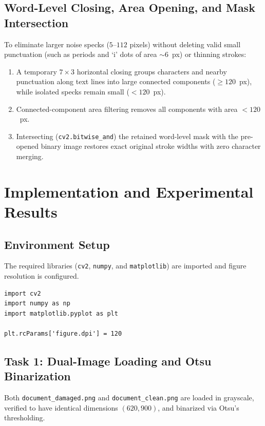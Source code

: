 \documentclass[12pt]{article}
\begin{document}
\subsection{Word-Level Closing, Area Opening, and Mask Intersection}
To eliminate larger noise specks ($5$--$112$ pixels) without deleting valid small punctuation (such as periods and `i' dots of area $\sim 6$~px) or thinning strokes:
\begin{enumerate}
    \item A temporary $7 \times 3$ horizontal closing groups characters and nearby punctuation along text lines into large connected components ($\ge 120$~px), while isolated specks remain small ($< 120$~px).
    \item Connected-component area filtering removes all components with area $< 120$~px.
    \item Intersecting (\texttt{cv2.bitwise\_and}) the retained word-level mask with the pre-opened binary image restores exact original stroke widths with zero character merging.
\end{enumerate}

\section{Implementation and Experimental Results}

\subsection{Environment Setup}
The required libraries (\texttt{cv2}, \texttt{numpy}, and \texttt{matplotlib}) are imported and figure resolution is configured.

\begin{lstlisting}[style=code, caption={Library imports and plotting configuration}]
import cv2
import numpy as np
import matplotlib.pyplot as plt

plt.rcParams['figure.dpi'] = 120
\end{lstlisting}

\subsection{Task 1: Dual-Image Loading and Otsu Binarization}
Both \texttt{document\_damaged.png} and \texttt{document\_clean.png} are loaded in grayscale, verified to have identical dimensions $(620, 900)$, and binarized via Otsu's thresholding.
\end{document}
